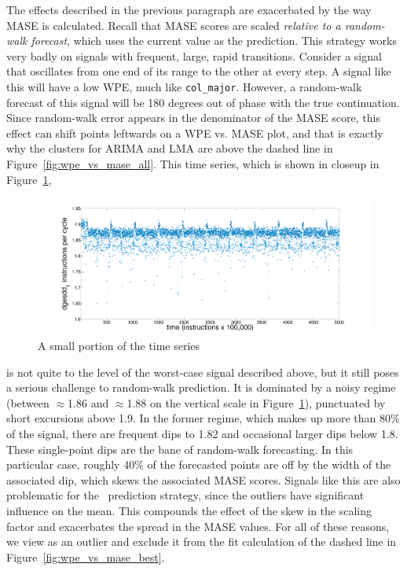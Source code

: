 The effects described in the previous paragraph are exacerbated by the
way MASE is calculated.  Recall that MASE scores are scaled
\emph{relative to a random-walk forecast}, which uses the current
value as the prediction.  This strategy works very badly on signals
with frequent, large, rapid transitions.  Consider a signal that
oscillates from one end of its range to the other at every step.  A
signal like this will have a low WPE, much like {\tt col\_major}.
However, a random-walk forecast of this signal will be 180 degrees out
of phase with the true continuation.  Since random-walk error appears
in the denominator of the MASE score, this effect can shift points
leftwards on a WPE vs. MASE plot, and that is exactly why the
\svdone clusters for ARIMA and LMA are above the dashed line in
Figure~\ref{fig:wpe_vs_mase_all}.  This time series, which is shown in
closeup in Figure~\ref{fig:svdone-ts},
\begin{figure}[htbp]
  \centering
    \includegraphics[width=\columnwidth]{figs/svdonets2}
\caption{A small portion of the \svdone time series}\label{fig:svdone-ts}
\end{figure}
is not quite to the level of the worst-case signal described above,
but it still poses a serious challenge to random-walk prediction.  It
is dominated by a noisy regime (between $\approx$1.86 and
$\approx$1.88 on the vertical scale in Figure~\ref{fig:svdone-ts}),
punctuated by short excursions above 1.9.  In the former regime, which
makes up more than 80\% of the signal, there are frequent dips to 1.82
and occasional larger dips below 1.8.  These single-point dips are the
bane of random-walk forecasting.  In this particular case, roughly
40\% of the forecasted points are off by the width of the associated
dip, which skews the associated MASE scores.  Signals like this are
also problematic for the \naive ~prediction strategy, since the
outliers have significant influence on the mean.  This compounds the
effect of the skew in the scaling factor and exacerbates the spread in
the \svdone MASE values.  For all of these reasons, we view \svdone as
an outlier and exclude it from the fit calculation of the dashed line
in Figure~\ref{fig:wpe_vs_mase_best}.

